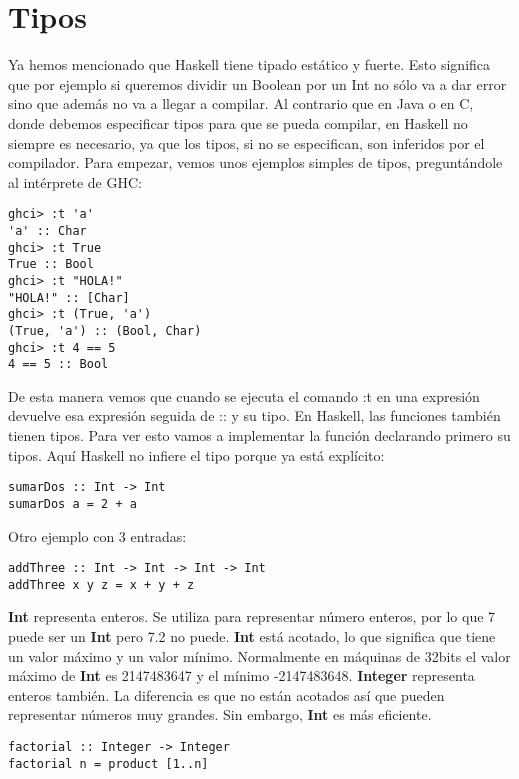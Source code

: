 \section{Tipos} %
\label{sec:tipos}

Ya hemos mencionado que Haskell tiene tipado estático y fuerte. Esto significa que por ejemplo si queremos dividir un Boolean por un Int no sólo va a dar error sino que además no va a llegar a compilar.
Al contrario que en Java o en C, donde debemos especificar tipos para que se pueda compilar, en Haskell no siempre es necesario, ya que los tipos, si no se especifican, son inferidos por el compilador.
Para empezar, vemos unos ejemplos simples de tipos, preguntándole al intérprete de GHC:

\begin{lstlisting}
ghci> :t 'a'
'a' :: Char
ghci> :t True
True :: Bool
ghci> :t "HOLA!"
"HOLA!" :: [Char]
ghci> :t (True, 'a')
(True, 'a') :: (Bool, Char)
ghci> :t 4 == 5
4 == 5 :: Bool
\end{lstlisting}


De esta manera vemos que cuando se ejecuta el comando :t en una expresión devuelve esa expresión seguida de :: y su tipo.
En Haskell, las funciones también tienen tipos. Para ver esto vamos a implementar la función declarando primero su tipos. Aquí Haskell no infiere el tipo porque ya está explícito:

\begin{lstlisting}
sumarDos :: Int -> Int
sumarDos a = 2 + a
\end{lstlisting}

Otro ejemplo con 3 entradas:

\begin{lstlisting}
addThree :: Int -> Int -> Int -> Int
addThree x y z = x + y + z
\end{lstlisting}

\textbf{Int} representa enteros. Se utiliza para representar número enteros, por lo que 7 puede ser un \textbf{Int} pero 7.2 no puede. \textbf{Int} está acotado, lo que significa que tiene un valor máximo y un valor mínimo. Normalmente en máquinas
de 32bits el valor máximo de \textbf{Int} es 2147483647 y el mínimo -2147483648.
\textbf{Integer} representa enteros también. La diferencia es que no están acotados así que pueden representar
números muy grandes. Sin embargo, \textbf{Int} es más eficiente.

\begin{lstlisting}
factorial :: Integer -> Integer
factorial n = product [1..n]
\end{lstlisting}


